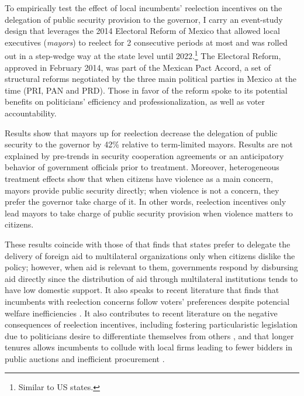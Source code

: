 \documentclass[12pt]{amsart}
\numberwithin{equation}{section}
\theoremstyle{definition}
\theoremstyle{definition}
\theoremstyle{definition}
\begin{document}
   To empirically test the effect of local incumbents' reelection incentives on the delegation of public security provision to the governor, I carry an event-study design that leverages the 2014 Electoral Reform of Mexico that allowed local executives (\emph{mayors}) to reelect for 2 consecutive periods at most and was rolled out in a step-wedge way at the state level until 2022.\footnote{Similar to US states.} The Electoral Reform, approved in February 2014, was part of the Mexican Pact Accord, a set of structural reforms negotiated by the three main political parties in Mexico at the time (PRI, PAN and PRD). Those in favor of the reform spoke to its potential benefits on politicians' efficiency and professionalization, as well as voter accountability. %
     
Results show that mayors up for reelection decrease the delegation of public security to the governor by 42\% relative to term-limited mayors. Results are not explained by pre-trends in security cooperation agreements or an anticipatory behavior of government officials prior to treatment.  Moreover, heterogeneous treatment effects show that when citizens have violence as a main concern, mayors provide public security directly; when violence is not a concern, they prefer the governor take charge of it. In other words, reelection incentives only lead mayors to take charge of public security provision when violence matters to citizens.

These results coincide with those of \citet{milner_2004} that finds that states prefer to delegate the delivery of foreign aid to multilateral organizations only when citizens dislike the policy; however, when aid is relevant to them, governments respond by disbursing aid directly since the distribution of aid through multilateral institutions tends to have low domestic support. It also speaks to recent literature that finds that incumbents with reelection concerns follow voters’ preferences despite potencial welfare inefficiencies \citep{pulejo_querubin_2021}. It also contributes to recent literature on the negative consequences of reelection incentives, including fostering  particularistic legislation due to politicians desire to differentiate themselves from others \citep{motolinia_2020}, and that longer tenures allows incumbents to collude with local firms leading to fewer bidders in public auctions and inefficient procurement \citep{coviello_etal_2017}. 
            
\end{document}

